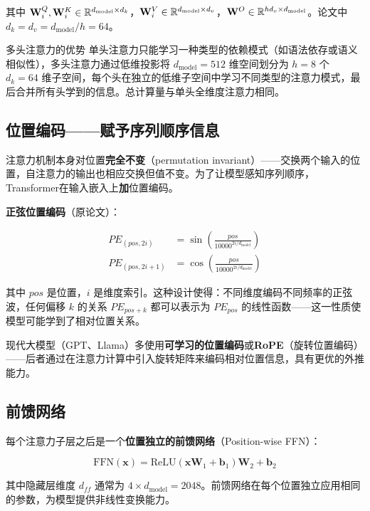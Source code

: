 其中 $\mathbf{W}_i^Q, \mathbf{W}_i^K \in \mathbb{R}^{d_{\text{model}} \times d_k}$，$\mathbf{W}_i^V \in \mathbb{R}^{d_{\text{model}} \times d_v}$，$\mathbf{W}^O \in \mathbb{R}^{h d_v \times d_{\text{model}}}$。论文中 $d_k = d_v = d_{\text{model}} / h = 64$。

\begin{myTheorem}{多头注意力的优势}
单头注意力只能学习一种类型的依赖模式（如语法依存或语义相似性），多头注意力通过低维投影将 $d_{\text{model}}=512$ 维空间划分为 $h=8$ 个 $d_k=64$ 维子空间，每个头在独立的低维子空间中学习不同类型的注意力模式，最后合并所有头学到的信息。总计算量与单头全维度注意力相同。
\end{myTheorem}

\subsection{位置编码——赋予序列顺序信息}

注意力机制本身对位置\textbf{完全不变}（permutation invariant）——交换两个输入的位置，自注意力的输出也相应交换但值不变。为了让模型感知序列顺序，Transformer在输入嵌入上\textbf{加}位置编码。

\textbf{正弦位置编码}（原论文）：

\[
\begin{aligned}
PE_{(pos, 2i)} &= \sin\!\left(\frac{pos}{10000^{2i / d_{\text{model}}}}\right) \\
PE_{(pos, 2i+1)} &= \cos\!\left(\frac{pos}{10000^{2i / d_{\text{model}}}}\right)
\end{aligned}
\]

其中 $pos$ 是位置，$i$ 是维度索引。这种设计使得：不同维度编码不同频率的正弦波，任何偏移 $k$ 的关系 $PE_{pos+k}$ 都可以表示为 $PE_{pos}$ 的线性函数——这一性质使模型可能学到了相对位置关系。

现代大模型（GPT、Llama）多使用\textbf{可学习的位置编码}或\textbf{RoPE}（旋转位置编码）——后者通过在注意力计算中引入旋转矩阵来编码相对位置信息，具有更优的外推能力。

\subsection{前馈网络}

每个注意力子层之后是一个\textbf{位置独立的前馈网络}（Position-wise FFN）：

\[
\text{FFN}(\mathbf{x}) = \text{ReLU}(\mathbf{x}\mathbf{W}_1 + \mathbf{b}_1)\mathbf{W}_2 + \mathbf{b}_2
\]

其中隐藏层维度 $d_{ff}$ 通常为 $4 \times d_{\text{model}} = 2048$。前馈网络在每个位置独立应用相同的参数，为模型提供非线性变换能力。

